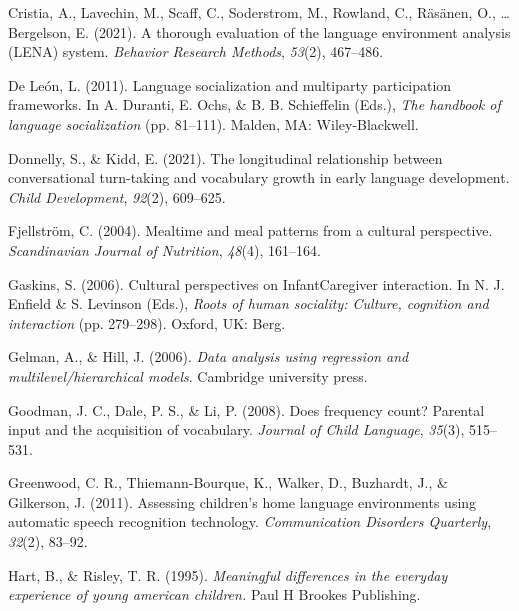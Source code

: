 \documentclass[
  man,floatsintext]{apa6}
\newlength{\cslhangindent}
\newlength{\cslentryspacingunit} %
\newenvironment{CSLReferences}[2] %
 {%
  \setlength{\parindent}{0pt}
  \ifodd #1
  \let\oldpar\par
  \def\par{\hangindent=\cslhangindent\oldpar}
  \fi
  \setlength{\parskip}{#2\cslentryspacingunit}
 }%
 {}
\begin{document}
\begin{CSLReferences}{1}{0}
\leavevmode{}%
Cristia, A., Lavechin, M., Scaff, C., Soderstrom, M., Rowland, C., Räsänen, O., \ldots{} Bergelson, E. (2021). A thorough evaluation of the language environment analysis (LENA) system. \emph{Behavior Research Methods}, \emph{53}(2), 467--486.

\leavevmode{}%
De León, L. (2011). Language socialization and multiparty participation frameworks. In A. Duranti, E. Ochs, \& B. B. Schieffelin (Eds.), \emph{The handbook of language socialization} (pp. 81--111). Malden, MA: Wiley-Blackwell.

\leavevmode{}%
Donnelly, S., \& Kidd, E. (2021). The longitudinal relationship between conversational turn-taking and vocabulary growth in early language development. \emph{Child Development}, \emph{92}(2), 609--625.

\leavevmode{}%
Fjellström, C. (2004). Mealtime and meal patterns from a cultural perspective. \emph{Scandinavian Journal of Nutrition}, \emph{48}(4), 161--164.

\leavevmode{}%
Gaskins, S. (2006). Cultural perspectives on InfantCaregiver interaction. In N. J. Enfield \& S. Levinson (Eds.), \emph{Roots of human sociality: Culture, cognition and interaction} (pp. 279--298). Oxford, UK: Berg.

\leavevmode{}%
Gelman, A., \& Hill, J. (2006). \emph{Data analysis using regression and multilevel/hierarchical models}. Cambridge university press.

\leavevmode{}%
Goodman, J. C., Dale, P. S., \& Li, P. (2008). Does frequency count? Parental input and the acquisition of vocabulary. \emph{Journal of Child Language}, \emph{35}(3), 515--531.

\leavevmode{}%
Greenwood, C. R., Thiemann-Bourque, K., Walker, D., Buzhardt, J., \& Gilkerson, J. (2011). Assessing children's home language environments using automatic speech recognition technology. \emph{Communication Disorders Quarterly}, \emph{32}(2), 83--92.

\leavevmode{}%
Hart, B., \& Risley, T. R. (1995). \emph{Meaningful differences in the everyday experience of young american children.} Paul H Brookes Publishing.


\end{CSLReferences}
\end{document}
